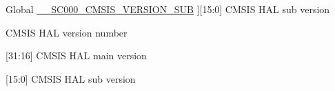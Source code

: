 \begin{DoxyRefList}
%
Global \hyperlink{core__sc000_8h_af4db9bbe5ff5726d8a8c388e52d5685d}{\+\_\+\+\_\+\+S\+C000\+\_\+\+C\+M\+S\+I\+S\+\_\+\+V\+E\+R\+S\+I\+O\+N\+\_\+\+S\+UB} ]\mbox{[}15\+:0\mbox{]} C\+M\+S\+IS H\+AL sub version  
\item[\label{deprecated__deprecated000036}%
\Hypertarget{deprecated__deprecated000036}%
Global \hyperlink{core__sc300_8h_a2f960c3c99ab33e1cf4b5287821c44dd}{\+\_\+\+\_\+\+S\+C300\+\_\+\+C\+M\+S\+I\+S\+\_\+\+V\+E\+R\+S\+I\+ON} ]C\+M\+S\+IS H\+AL version number  
\item[\label{deprecated__deprecated000034}%
\Hypertarget{deprecated__deprecated000034}%
Global \hyperlink{core__sc300_8h_a0e2124db4f74f2b355904314accf1790}{\+\_\+\+\_\+\+S\+C300\+\_\+\+C\+M\+S\+I\+S\+\_\+\+V\+E\+R\+S\+I\+O\+N\+\_\+\+M\+A\+IN} ]\mbox{[}31\+:16\mbox{]} C\+M\+S\+IS H\+AL main version  
\item[\label{deprecated__deprecated000035}%
\Hypertarget{deprecated__deprecated000035}%
Global \hyperlink{core__sc300_8h_a664c9e59952455ddeee28173b864fe9d}{\+\_\+\+\_\+\+S\+C300\+\_\+\+C\+M\+S\+I\+S\+\_\+\+V\+E\+R\+S\+I\+O\+N\+\_\+\+S\+UB} ]\mbox{[}15\+:0\mbox{]} C\+M\+S\+IS H\+AL sub version 
\end{DoxyRefList}